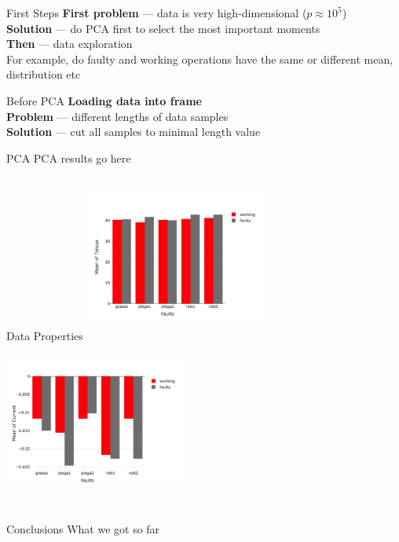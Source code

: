 \documentclass[9pt]{beamer}
\begin{document}
\begin{frame}{First Steps}
\textbf{First problem} --- data is very high-dimensional ($p\approx 10^5$)\\
\textbf{Solution} --- do PCA first to select the most important moments\\[.4cm]
\textbf{Then} --- data exploration\\
For example, do faulty and working operations have the same or different mean, distribution etc
\end{frame}
\begin{frame}{Before PCA}
\textbf{\large Loading data into frame}\\
\textbf{Problem} --- different lengths of data samples\\
\textbf{Solution} --- cut all samples to minimal length value
\end{frame}
\begin{frame}{PCA}
PCA results go here
\end{frame}
\begin{frame}{Data Properties}
\includegraphics[width=6cm, height= 5.5cm]{TorqueMean.png}
\includegraphics[width=6cm, height=5.5cm]{CurrentMean.png}
\end{frame}
\begin{frame}{Conclusions}
What we got so far
\end{frame}
\end{document}
